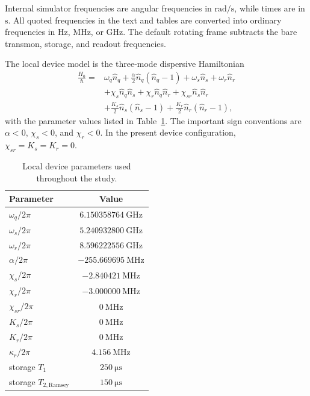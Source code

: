 \documentclass[aps,pra,twocolumn,reprint,floatfix,amsmath,amssymb]{revtex4-2}
\begin{document}
Internal simulator frequencies are angular frequencies in \(\si{\radian\per\second}\), while times are in \(\si{\second}\). All quoted frequencies in the text and tables are converted into ordinary frequencies in \(\si{\hertz}\), \(\si{\mega\hertz}\), or \(\si{\giga\hertz}\). The default rotating frame subtracts the bare transmon, storage, and readout frequencies.

The local device model is the three-mode dispersive Hamiltonian
\begin{equation}
\begin{split}
\frac{H_0}{\hbar}={}&
\omega_q \hat{n}_q
+ \frac{\alpha}{2}\hat{n}_q(\hat{n}_q-1)
+ \omega_s \hat{n}_s
+ \omega_r \hat{n}_r \\
&+ \chi_s \hat{n}_q \hat{n}_s
+ \chi_r \hat{n}_q \hat{n}_r
+ \chi_{sr}\hat{n}_s \hat{n}_r \\
&+ \frac{K_s}{2}\hat{n}_s(\hat{n}_s-1)
+ \frac{K_r}{2}\hat{n}_r(\hat{n}_r-1),
\end{split}
\label{eq:drift}
\end{equation}
with the parameter values listed in Table~\ref{tab:device_parameters}. The important sign conventions are \(\alpha<0\), \(\chi_s<0\), and \(\chi_r<0\). In the present device configuration, \(\chi_{sr}=K_s=K_r=0\).

\begin{table}[t]
\caption{Local device parameters used throughout the study.}
\label{tab:device_parameters}
\begin{tabular}{lc}
\toprule
Parameter & Value \\
\midrule
\(\omega_q/2\pi\) & \(\SI{6.150358764}{\giga\hertz}\) \\
\(\omega_s/2\pi\) & \(\SI{5.240932800}{\giga\hertz}\) \\
\(\omega_r/2\pi\) & \(\SI{8.596222556}{\giga\hertz}\) \\
\(\alpha/2\pi\) & \(\SI{-255.669695}{\mega\hertz}\) \\
\(\chi_s/2\pi\) & \(\SI{-2.840421}{\mega\hertz}\) \\
\(\chi_r/2\pi\) & \(\SI{-3.000000}{\mega\hertz}\) \\
\(\chi_{sr}/2\pi\) & \(\SI{0}{\mega\hertz}\) \\
\(K_s/2\pi\) & \(\SI{0}{\mega\hertz}\) \\
\(K_r/2\pi\) & \(\SI{0}{\mega\hertz}\) \\
\(\kappa_r/2\pi\) & \(\SI{4.156}{\mega\hertz}\) \\
storage \(T_1\) & \(\SI{250}{\micro\second}\) \\
storage \(T_{2,\mathrm{Ramsey}}\) & \(\SI{150}{\micro\second}\) \\
\bottomrule
\end{tabular}
\end{table}
\end{document}
